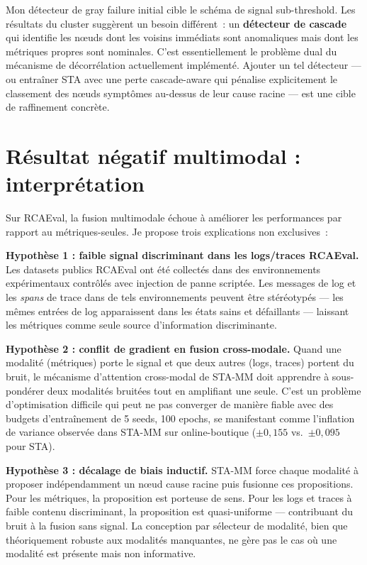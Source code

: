 \documentclass[a4paper,11pt,oneside]{report}
\begin{document}
Mon d\'etecteur de gray failure initial cible le sch\'ema de signal sub-threshold. Les r\'esultats du cluster sugg\`erent un besoin diff\'erent~: un \textbf{d\'etecteur de cascade} qui identifie les nœuds dont les voisins imm\'ediats sont anomaliques mais dont les m\'etriques propres sont nominales. C'est essentiellement le probl\`eme dual du m\'ecanisme de d\'ecorr\'elation actuellement impl\'ement\'e. Ajouter un tel d\'etecteur --- ou entra\^iner STA avec une perte cascade-aware qui p\'enalise explicitement le classement des nœuds sympt\^omes au-dessus de leur cause racine --- est une cible de raffinement concr\`ete.

\section{R\'esultat n\'egatif multimodal : interpr\'etation}
\label{sec:disc-mm}

Sur RCAEval, la fusion multimodale \'echoue \`a am\'eliorer les performances par rapport au m\'etriques-seules. Je propose trois explications non exclusives~:

\textbf{Hypoth\`ese 1 : faible signal discriminant dans les logs/traces RCAEval.} Les datasets publics RCAEval ont \'et\'e collect\'es dans des environnements exp\'erimentaux contr\^ol\'es avec injection de panne script\'ee. Les messages de log et les \emph{spans} de trace dans de tels environnements peuvent \^etre st\'er\'eotyp\'es --- les m\^emes entr\'ees de log apparaissent dans les \'etats sains et d\'efaillants --- laissant les m\'etriques comme seule source d'information discriminante.

\textbf{Hypoth\`ese 2 : conflit de gradient en fusion cross-modale.} Quand une modalit\'e (m\'etriques) porte le signal et que deux autres (logs, traces) portent du bruit, le m\'ecanisme d'attention cross-modal de STA-MM doit apprendre \`a sous-pond\'erer deux modalit\'es bruit\'ees tout en amplifiant une seule. C'est un probl\`eme d'optimisation difficile qui peut ne pas converger de mani\`ere fiable avec des budgets d'entra\^inement de 5 seeds, 100 epochs, se manifestant comme l'inflation de variance observ\'ee dans STA-MM sur online-boutique ($\pm 0{,}155$ vs.\ $\pm 0{,}095$ pour STA).

\textbf{Hypoth\`ese 3 : d\'ecalage de biais inductif.} STA-MM force chaque modalit\'e \`a proposer ind\'ependamment un nœud cause racine puis fusionne ces propositions. Pour les m\'etriques, la proposition est porteuse de sens. Pour les logs et traces \`a faible contenu discriminant, la proposition est quasi-uniforme --- contribuant du bruit \`a la fusion sans signal. La conception par s\'electeur de modalit\'e, bien que th\'eoriquement robuste aux modalit\'es manquantes, ne g\`ere pas le cas o\`u une modalit\'e est pr\'esente mais non informative.
\end{document}
